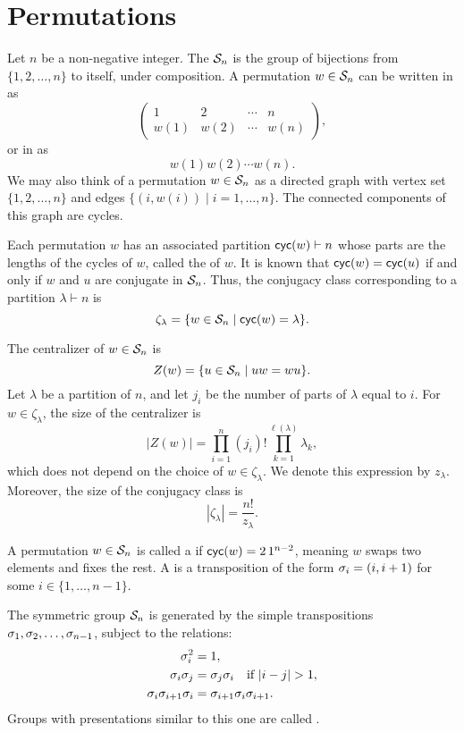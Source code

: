 \chapter{Permutations}

Let \(n\) be a non-negative integer.
The  \(\mathcal{S}_{n}\)
is the group of bijections from \(\{1, 2, \ldots, n\}\) to itself,
under composition.
A permutation \(w \in \mathcal{S}_{n}\) can be written in  as
\[
    \begin{pmatrix}
        1    & 2    & \cdots & n    \\
        w(1) & w(2) & \cdots & w(n)
    \end{pmatrix},
\]
or in  as
\[
    w(1)w(2)\cdots w(n).
\]
We may also think of a permutation \(w \in \mathcal{S}_{n}\) as a directed graph with vertex set \(\{1, 2, \ldots, n\}\) and edges \(\{(i, w(i)) \mid i = 1, \ldots, n\}\). The connected components of this graph are cycles.


Each permutation \(w\) has an associated partition \(\operatorname{\mathsf{cyc}}(w) \vdash n\) whose parts are the lengths of the cycles of \(w\), called the  of \(w\). It is known that \(\operatorname{\mathsf{cyc}}(w) = \operatorname{\mathsf{cyc}}(u)\) if and only if \(w\) and \(u\) are conjugate in \(\mathcal{S}_{n}\). Thus, the conjugacy class corresponding to a partition \(\lambda \vdash n\) is
\[
    \zeta_\lambda = \{ w \in \mathcal{S}_{n} \mid \operatorname{\mathsf{cyc}}(w) = \lambda \}.
\]

The centralizer of \(w \in \mathcal{S}_{n}\) is
\[
    Z(w) = \{ u \in \mathcal{S}_{n} \mid uw = wu \}.
\]
Let \(\lambda\) be a partition of \(n\), and let \(j_i\) be the number of parts of \(\lambda\) equal to \(i\). For \(w \in \zeta_\lambda\), the size of the centralizer is
\[
    |Z(w)| = \prod_{i=1}^n (j_i)! \prod_{k=1}^{\ell(\lambda)} \lambda_k,
\]
which does not depend on the choice of \(w \in \zeta_\lambda\). We denote this expression by \(z_\lambda\). Moreover, the size of the conjugacy class is
\[
    |\zeta_\lambda| = \frac{n!}{z_\lambda}.
\]

A permutation \(w \in \mathcal{S}_{n}\) is called a  if \(\operatorname{\mathsf{cyc}}(w) = 2\,1^{n-2}\), meaning \(w\) swaps two elements and fixes the rest. A  is a transposition of the form \(\sigma_{i} = (i, i+1)\) for some \(i \in \{1, \ldots, n-1\}\).

The symmetric group \(\mathcal{S}_{n}\) is generated by the simple transpositions \(\sigma_{1}, \sigma_{2}, \ldots, \sigma_{n-1}\), subject to the relations:
\begin{align*}
    \sigma_{i}^2                 & = 1,                                           \\
    \sigma_{i}\sigma_{j}           & = \sigma_{j}\sigma_{i} \quad \text{if } |i-j| > 1, \\
    \sigma_{i}\sigma_{i+1}\sigma_{i} & = \sigma_{i+1}\sigma_{i}\sigma_{i+1}.
\end{align*}
Groups with presentations similar to this one are called .

